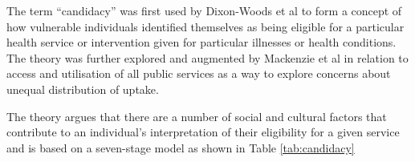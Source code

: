 \documentclass[12pt,]{report}
\begin{document}
The term ``candidacy'' was first used by Dixon-Woods et al
\citetext{\citeyear{RN438}; \citeyear{RN437}} to form a concept of how
vulnerable individuals identified themselves as being eligible for a
particular health service or intervention given for particular illnesses
or health conditions. The theory was further explored and augmented by
Mackenzie et al \citetext{\citeyear{RN84}; \citeyear{RN434}} in relation
to access and utilisation of all public services as a way to explore
concerns about unequal distribution of uptake.

The theory argues that there are a number of social and cultural factors
that contribute to an individual's interpretation of their eligibility
for a given service and is based on a seven-stage model as shown in
Table \ref{tab:candidacy}

\begin{table}[h]
\centering
\caption{Seven stage model of candidacy}
\label{tab:candidacy}
\end{table}
\end{document}
